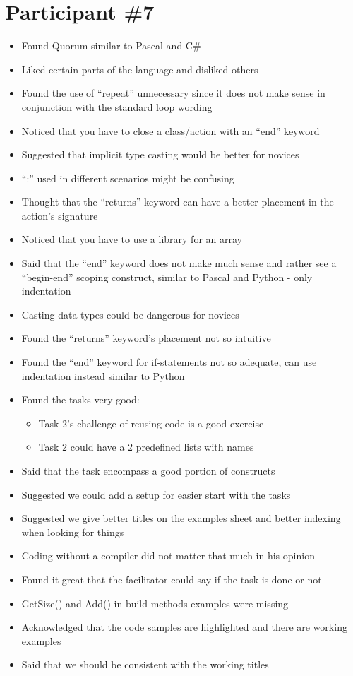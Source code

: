 \section{Participant {\#}7}
\begin{itemize}
\item Found Quorum similar to Pascal and C\#
\item Liked certain parts of the language and disliked others
\item Found the use of “repeat” unnecessary since it does not make sense in conjunction with the standard loop wording
\item Noticed that you have to close a class/action with an “end” keyword
\item Suggested that implicit type casting would be better for novices
\item “:” used in different scenarios might be confusing
\item Thought that the “returns” keyword can have a better placement in the action’s signature
\item Noticed that you have to use a library for an array
\item Said that the “end” keyword does not make much sense and rather see a “begin-end” scoping construct, similar to Pascal and Python - only indentation
\item Casting data types could be dangerous for novices
\item Found the “returns” keyword’s placement not so intuitive 
\item Found the “end” keyword for if-statements not so adequate, can use indentation instead similar to Python
\item Found the tasks very good:
	\begin{itemize}
		\item Task 2’s challenge of reusing code is a good exercise 
		\item Task 2 could have a 2 predefined lists with names
	\end{itemize}
\item Said that the task encompass a good portion of constructs 
\item Suggested we could add a setup for easier start with the tasks
\item Suggested we give better titles on the examples sheet and better indexing when looking for things
\item Coding without a compiler did not matter that much in his opinion
\item Found it great that the facilitator could say if the task is done or not
\item GetSize() and Add() in-build methods examples were missing
\item Acknowledged that the code samples are highlighted and there are working examples
\item Said that we should be consistent with the working titles
\end{itemize}
